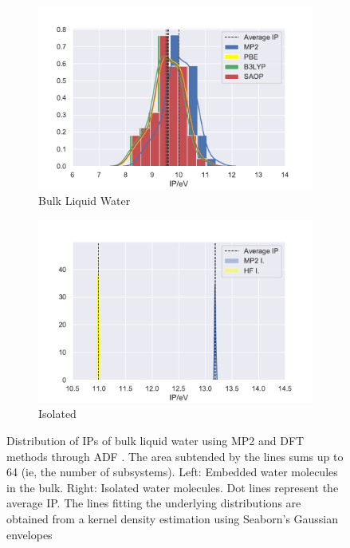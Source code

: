 \documentclass[12pt,a4paper]{article}
\begin{document}
\begin{figure}[!ht]
        \captionsetup[subfigure]{labelformat=empty}
        \centering
        \begin{subfigure}{0.4\linewidth}
                \includegraphics[width=\linewidth]{images/bulkmp2dft}
                \caption{Bulk Liquid Water}
        \end{subfigure}
        \begin{subfigure}{0.4\linewidth}
                \includegraphics[width=\linewidth]{images/isomp2dft}
                \caption{Isolated}
        \end{subfigure}
        \caption{Distribution of IPs of bulk liquid water using MP2 and DFT methods through ADF \cite{te2001chemistry}. The area subtended by the lines sums up to 64 (ie, the number of subsystems). Left: Embedded water molecules in the bulk. Right: Isolated water molecules. Dot lines represent the average IP. The lines fitting the underlying distributions are obtained from a kernel density estimation using Seaborn's Gaussian envelopes\cite{waskom2017c}}
\end{figure}
\end{document}
